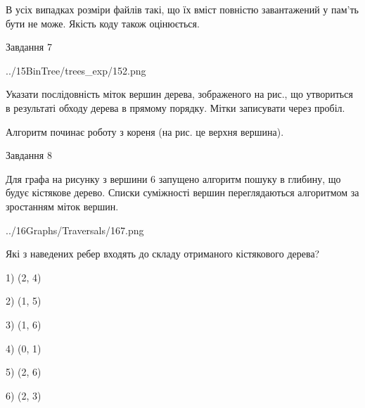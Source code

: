 \documentclass[12pt, ukrainian]{article}
\begin{document}
{В усіх випадках розміри файлів такі, що їх вміст повністю завантажений у пам'ть бути не може. Якість коду також оцінюється.



\vspace{10mm}\par

\newpage
\begin{minipage}[t]{9.7cm}
               
{\begin{center}Завдання {7}\end{center}}
\vspace{-4mm}

\begin{center}
	{../15BinTree/trees_exp/152.png}
\end{center}
Указати послідовність міток вершин дерева, зображеного на рис., що утвориться в результаті обходу дерева в прямому порядку. Мітки записувати через пробіл.\par Алгоритм починає роботу з кореня (на рис. це верхня вершина).\par

\end{minipage}
\vline \hspace{8mm}
\begin{minipage}[t]{8.0cm}
               
{\begin{center}Завдання {8}\end{center}}
\vspace{-4mm}
Для графа на рисунку з вершини 6 запущено алгоритм пошуку в глибину, що будує кістякове дерево. Списки суміжності вершин переглядаються алгоритмом за зростанням міток вершин.\par
\begin{center}
	{../16Graphs/Traversals/167.png}
\end{center}
\par Які з наведених ребер входять до складу отриманого кістякового дерева?\par
1) (2, 4)\par
2) (1, 5)\par
3) (1, 6)\par
4) (0, 1)\par
5) (2, 6)\par
6) (2, 3)\par
{\vskip 15pt} \par


\end{minipage}}
\end{document}

